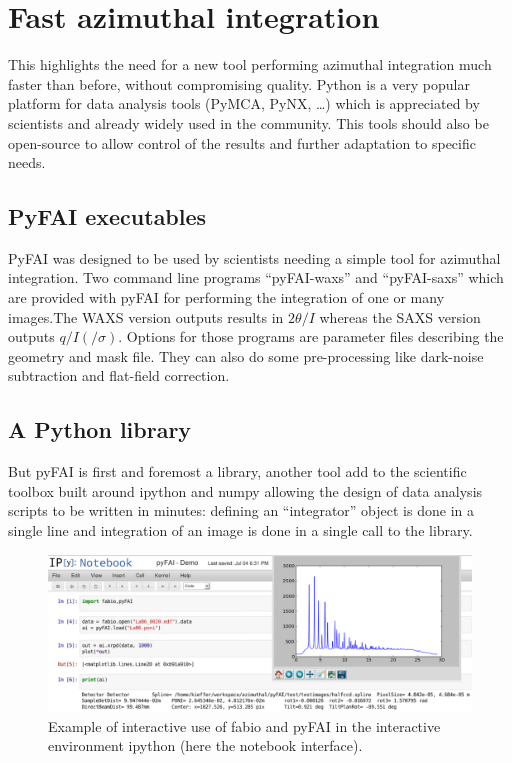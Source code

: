 \documentclass[a4paper]{jpconf}
\begin{document}
\section{Fast azimuthal integration}
This highlights the need for a new tool performing azimuthal integration much
faster than before, without compromising quality. Python is a very popular
platform for data analysis tools (PyMCA\cite{pymca}, PyNX\cite{pynx}, \ldots)
which is appreciated by scientists and already widely used in the community.
This tools should also be open-source to allow control of the results and
further adaptation to specific needs.

\subsection{PyFAI executables}
PyFAI was designed to be used by scientists needing a simple tool for azimuthal
integration. Two command line programs “pyFAI-waxs” and “pyFAI-saxs”
which are provided with pyFAI for performing the integration of one or many
images.The WAXS version outputs results in $2\theta /I$  whereas the SAXS version outputs $q/I(/\sigma )$.
Options for those programs are parameter  files describing the geometry and mask file. They can
also do some  pre-processing like dark-noise subtraction and flat-field correction.


\subsection{A Python library}
But pyFAI is first and foremost a library, another tool add to the scientific
toolbox built around ipython\cite{ipython} and numpy\cite{numpy} allowing the
design of data analysis scripts to be written in minutes: defining an ``integrator'' object is done in a
single line and integration of an image is done in a single call to the library.

\begin{center}
\begin{figure}[h]
\includegraphics[width=15cm]{img/notebook-l.eps}
\caption{\label{notebook} Example of interactive use of fabio and pyFAI in the
interactive environment ipython (here the notebook interface).}
\end{figure}
\end{center}
\end{document}
